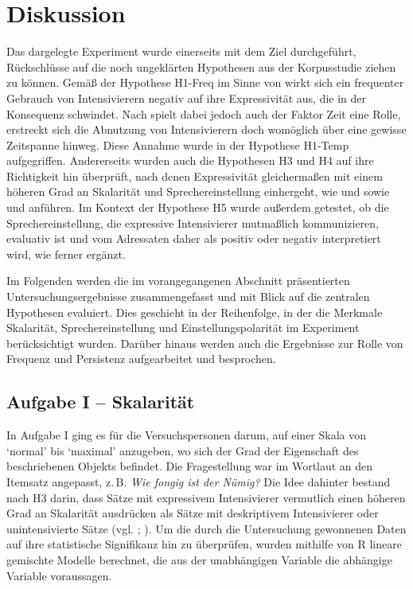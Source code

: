\section{Diskussion}\label{abs:Diskussion22}
Das dargelegte Experiment wurde einerseits mit dem Ziel durchgeführt, Rückschlüsse auf die noch ungeklärten Hypothesen aus der Korpusstudie ziehen zu können. Gemäß der Hypothese H1-Freq im Sinne von {\citet[2]{Hauschild.1899}} wirkt sich ein frequenter Gebrauch von Intensivierern negativ auf ihre Expressivität aus, die in der Konsequenz schwindet. Nach {\citet[59]{Tobler.1868}} spielt dabei jedoch auch der Faktor Zeit eine Rolle, erstreckt sich die Abnutzung von Intensivierern doch womöglich über eine gewisse Zeitspanne hinweg. Diese Annahme wurde in der Hypothese {H1-Temp} aufgegriffen. Andererseits wurden auch die {Hypothesen H3 und H4} auf ihre Richtigkeit hin überprüft, nach denen Expressivität gleichermaßen mit einem höheren Grad an Skalarität und Sprechereinstellung einhergeht, wie {\citet[22]{Paradis.1997}} und {\citet[133]{Gutzmann.2019a}} sowie {\citet[315]{Lang.1983}} und {\citet[57]{Ortner.2014}} anführen. Im Kontext der {Hypothese H5} wurde außerdem getestet, ob die Sprechereinstellung, die expressive Intensivierer mutmaßlich kommunizieren, evaluativ ist und vom Adressaten daher als positiv oder negativ interpretiert wird, wie {\citet[135]{Gutzmann.2019a}} ferner ergänzt.


Im Folgenden werden die im vorangegangenen Abschnitt präsentierten Untersuchungsergebnisse zusammengefasst und mit Blick auf die zentralen Hypothesen evaluiert. Dies geschieht in der Reihenfolge, in der die Merkmale Skalarität, Sprechereinstellung und Einstellungspolarität im Experiment berücksichtigt wurden. Darüber hinaus werden auch die Ergebnisse zur Rolle von Frequenz und Persistenz aufgearbeitet und besprochen.




\subsection{Aufgabe I -- Skalarität}
In Aufgabe I ging es für die Versuchspersonen darum, auf einer Skala von `normal' bis `maximal' anzugeben, wo sich der Grad der Eigenschaft des beschriebenen Objekts befindet. Die Fragestellung war im Wortlaut an den Itemsatz angepasst, z.\,B. \textit{Wie fongig ist der Nümig?} Die Idee dahinter bestand nach H3 darin, dass Sätze mit expressivem Intensivierer vermutlich einen höheren Grad an Skalarität ausdrücken als Sätze mit deskriptivem Intensivierer oder unintensivierte Sätze (vgl. {\citealt[22]{Paradis.1997}}; {\citealt[133]{Gutzmann.2019a})}. Um die durch die Untersuchung gewonnenen Daten auf ihre statistische Signifikanz hin zu überprüfen, wurden mithilfe von R lineare gemischte Modelle berechnet, die aus der unabhängigen Variable die abhängige Variable voraussagen.


